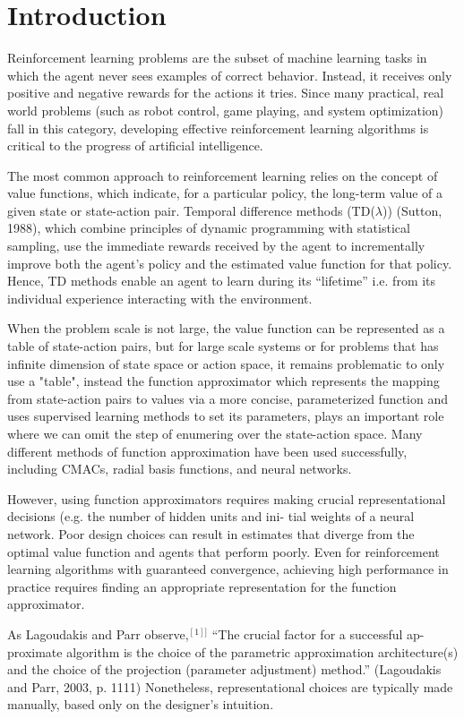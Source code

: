 \documentclass{article}
\begin{document}
\section{Introduction}
Reinforcement learning problems are the subset of machine learning tasks in which the agent never sees examples of correct behavior. Instead, it receives only positive and negative rewards for the actions it tries.
 Since many practical, real world problems (such as robot control, game playing, and system optimization) fall in this category, developing effective reinforcement learning algorithms is critical to the 
 progress of artificial intelligence.

 The most common approach to reinforcement learning relies on the concept of value functions, which indicate, for a particular policy, the long-term value of a given state or state-action pair. Temporal difference methods (TD($\lambda$)) (Sutton, 1988),
which combine principles of dynamic programming with statistical sampling, use the immediate rewards received by the agent to incrementally improve both the agent’s policy and the estimated 
 value function for that policy. Hence, TD methods enable an agent to learn during its “lifetime” i.e. from its individual experience interacting with the environment.

When the problem scale is not large, the value function can be represented as a table of state-action pairs, but for large scale systems or for problems that has infinite dimension of 
state space or action space, it remains problematic to only use a "table", instead the function approximator which represents the mapping from state-action pairs to values via a more concise,
parameterized function and uses supervised learning methods to set its parameters, plays an important role where we can omit the step of enumering over
the state-action space.  Many different methods of function approximation have been used successfully, including CMACs, radial basis functions, and neural networks.

However, using function approximators requires making crucial representational decisions (e.g. the number of hidden units and ini- tial weights of a neural network. 
Poor design choices can result in estimates that diverge from the optimal value function and agents that perform poorly. Even for reinforcement learning algorithms 
with guaranteed convergence, achieving high performance in practice requires finding an appropriate representation for the function approximator. 

As Lagoudakis and Parr observe,$^{[1]]}$ “The crucial factor for a successful ap- proximate algorithm is the choice of the parametric approximation architecture(s) and the choice of the projection (parameter adjustment) method.” (Lagoudakis and Parr, 2003, p. 1111) Nonetheless, representational choices are typically made manually, based only on the designer’s intuition.
\end{document}
